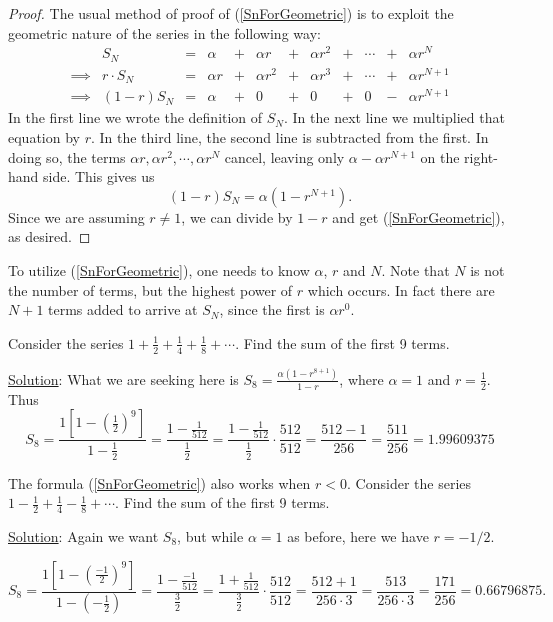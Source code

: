 \begin{proof}
The usual method of proof of (\ref{SnForGeometric}) is to exploit
the geometric nature of the series in the following way:
$$\begin{array}{lccccccccccc}
&S_N&=&\alpha&+&\alpha r&+&\alpha r^2&+&\cdots&+&\alpha r^N\\
\implies
&r\cdot S_N&=&\alpha r&+&\alpha r^2&+&\alpha r^3&+&\cdots&+&\alpha r^{N+1}\\
\hline
\implies&(1-r)S_N&=&\alpha&+&0&+&0&+&0&-&\alpha r^{N+1}\end{array}$$
In the first line we wrote the definition of $S_N$.  In the next
line we multiplied that equation by $r$.  In the third line,
the second line is subtracted from the first. In doing so,
the terms $\alpha r,\alpha r^2,\cdots,\alpha r^{N}$ cancel,
leaving only $\alpha-\alpha r^{N+1}$ on the right-hand side. 
This gives us
$$(1-r)S_N=\alpha\left(1-r^{N+1}\right).$$
Since we are assuming $r\ne1$, we can divide by $1-r$ and get
(\ref{SnForGeometric}), as desired.
\end{proof}

To utilize (\ref{SnForGeometric}), one needs to know $\alpha$, $r$ and $N$.
Note that $N$ is not the number of terms, but the highest power
of $r$ which occurs.  In fact there are $N+1$ terms added
to arrive at $S_N$, since the first is $\alpha r^0$.

\bex Consider the series $1+\frac12+\frac14+\frac18+\cdots$.
     Find the sum of the first 9 terms.

\underline{Solution}: What we are seeking here is 
$S_8=\frac{\alpha\left(1-r^{8+1}\right)}{1-r}$,
where $\alpha=1$ and $r=\frac12$.  Thus
$$S_8=\frac{1\left[1-\left(\frac12\right)^9\right]}{1-\frac12}
     =\frac{1-\frac1{512}}{\frac12}
     =\frac{1-\frac1{512}}{\frac12}\cdot\frac{512}{512}
     =\frac{512-1}{256}=\frac{511}{256}=1.99609375$$
\eex

The formula (\ref{SnForGeometric}) also works when $r<0$.
\bex Consider the series $1-\frac12+\frac14-\frac18+\cdots$.
Find the sum of the first 9 terms.

\underline{Solution}: Again we want $S_8$, but while $\alpha=1$ as before,
here we have $r=-1/2$.

$$S_8=\frac{1\left[1-\left(\frac{-1}2\right)^9\right]}{1-\left(-\frac12\right)}
     =\frac{1-\frac{-1}{512}}{\frac32}
     =\frac{1+\frac1{512}}{\frac32}\cdot\frac{512}{512}
     =\frac{512+1}{256\cdot3}
     =\frac{513}{256\cdot3}
     =\frac{171}{256}=0.66796875.$$





